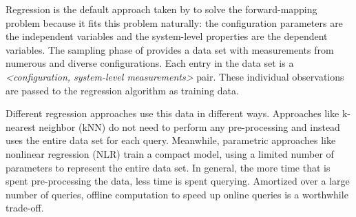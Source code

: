Regression is the default approach taken by \fw to solve the forward-mapping problem because
it fits this problem naturally: the configuration parameters are the independent variables and the system-level properties are the dependent variables.
The sampling phase of \fw provides a data set with measurements from numerous and diverse configurations.
Each entry in the data set is a \textit{<configuration, system-level measurements>} pair.
These individual observations are passed to the regression algorithm as training data.

Different regression approaches use this data in different ways.
Approaches like k-nearest neighbor (kNN) do not need to perform any pre-processing and instead uses the entire data set for each query.
Meanwhile, parametric approaches like nonlinear regression (NLR) train a compact model, using a limited number of parameters to represent the entire data set.
In general, the more time that is spent pre-processing the data, less time is spent querying.
Amortized over a large number of queries, offline computation to speed up online queries is a worthwhile trade-off.



